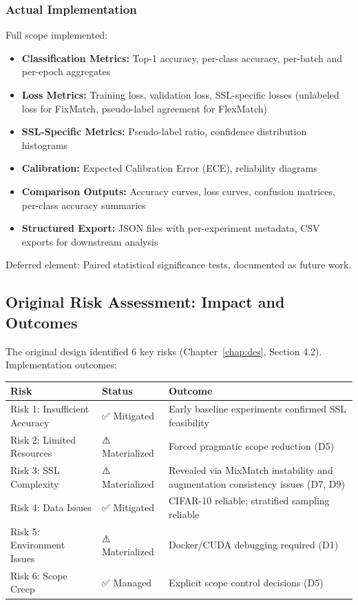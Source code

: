 \subsubsection{Actual Implementation}

Full scope implemented:

\begin{itemize}
    \item \textbf{Classification Metrics:} Top-1 accuracy, per-class accuracy, per-batch and per-epoch aggregates
    \item \textbf{Loss Metrics:} Training loss, validation loss, SSL-specific losses (unlabeled loss for FixMatch, pseudo-label agreement for FlexMatch)
    \item \textbf{SSL-Specific Metrics:} Pseudo-label ratio, confidence distribution histograms
    \item \textbf{Calibration:} Expected Calibration Error (ECE), reliability diagrams
    \item \textbf{Comparison Outputs:} Accuracy curves, loss curves, confusion matrices, per-class accuracy summaries
    \item \textbf{Structured Export:} JSON files with per-experiment metadata, CSV exports for downstream analysis
\end{itemize}

Deferred element: Paired statistical significance tests, documented as future work.

\subsection{Original Risk Assessment: Impact and Outcomes}

The original design identified 6 key risks (Chapter~\ref{chap:des}, Section 4.2). Implementation outcomes:

\begin{center}
\small
\begin{tabular}{|p{3.5cm}|p{1.5cm}|p{3.5cm}|}
\hline
\textbf{Risk} & \textbf{Status} & \textbf{Outcome} \\
\hline
Risk 1: Insufficient Accuracy & ✅ Mitigated & Early baseline experiments confirmed SSL feasibility \\
\hline
Risk 2: Limited Resources & ⚠ Materialized & Forced pragmatic scope reduction (D5) \\
\hline
Risk 3: SSL Complexity & ⚠ Materialized & Revealed via MixMatch instability and augmentation consistency issues (D7, D9) \\
\hline
Risk 4: Data Issues & ✅ Mitigated & CIFAR-10 reliable; stratified sampling reliable \\
\hline
Risk 5: Environment Issues & ⚠ Materialized & Docker/CUDA debugging required (D1) \\
\hline
Risk 6: Scope Creep & ✅ Managed & Explicit scope control decisions (D5) \\
\hline
\end{tabular}
\end{center}

